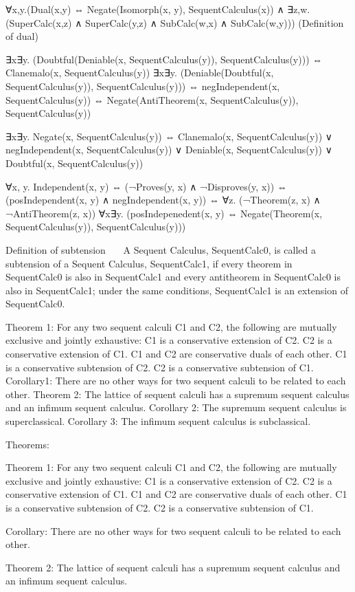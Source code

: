 ∀x,y.(Dual(x,y) ⇔ Negate(Isomorph(x, y), SequentCalculus(x)) ∧ ∃z,w.(SuperCalc(x,z) ∧ SuperCalc(y,z) ∧ SubCalc(w,x) ∧ SubCalc(w,y))) (Definition of dual)

∃x∃y. (Doubtful(Deniable(x, SequentCalculus(y)), SequentCalculus(y))) ⇔ Clanemalo(x, SequentCalculus(y))
∃x∃y. (Deniable(Doubtful(x, SequentCalculus(y)), SequentCalculus(y))) ⇔ negIndependent(x, SequentCalculus(y)) ⇔ Negate(AntiTheorem(x, SequentCalculus(y)), SequentCalculus(y))

∃x∃y. Negate(x, SequentCalculus(y)) ⇔ Clanemalo(x, SequentCalculus(y)) ∨ negIndependent(x, SequentCalculus(y)) ∨ Deniable(x, SequentCalculus(y)) ∨ Doubtful(x, SequentCalculus(y))

∀x, y. Independent(x, y) ⇔ (¬Proves(y, x) ∧ ¬Disproves(y, x)) ⇔ (posIndependent(x, y) ∧ negIndependent(x, y)) ⇔ ∀z. (¬Theorem(z, x) ∧ ¬AntiTheorem(z, x))
∀x∃y. (posIndepenedent(x, y) ⇔ Negate(Theorem(x, SequentCalculus(y)), SequentCalculus(y)))

   Definition of subtension   
A Sequent Calculus, SequentCalc0, is called a subtension of a Sequent Calculus, SequentCalc1, if every theorem in SequentCalc0 is also in SequentCalc1 and every antitheorem in SequentCalc0 is also in SequentCalc1; under the same conditions, SequentCalc1 is an extension of SequentCalc0.

Theorem 1: For any two sequent calculi C1 and C2, the following are mutually exclusive and jointly exhaustive:
C1 is a conservative extension of C2.
C2 is a conservative extension of C1.
C1 and C2 are conservative duals of each other.
C1 is a conservative subtension of C2.
C2 is a conservative subtension of C1.
Corollary1: There are no other ways for two sequent calculi to be related to each other.
Theorem 2: The lattice of sequent calculi has a supremum sequent calculus and an infimum sequent calculus.
Corollary 2: The supremum sequent calculus is superclassical.
Corollary 3: The infimum sequent calculus is subclassical.

Theorems:

Theorem 1: For any two sequent calculi C1 and C2, the following are mutually exclusive and jointly exhaustive:
C1 is a conservative extension of C2.
C2 is a conservative extension of C1.
C1 and C2 are conservative duals of each other.
C1 is a conservative subtension of C2.
C2 is a conservative subtension of C1.

Corollary: There are no other ways for two sequent calculi to be related to each other.

Theorem 2: The lattice of sequent calculi has a supremum sequent calculus and an infimum sequent calculus.

